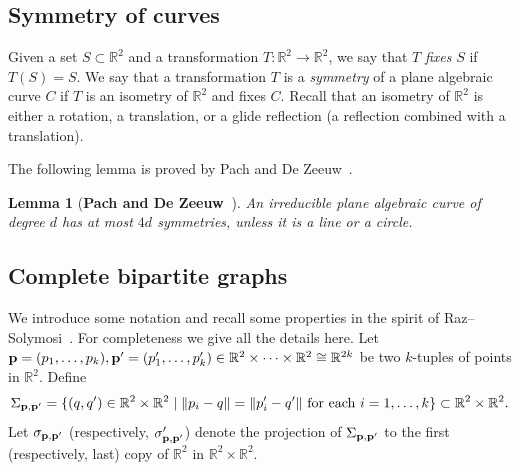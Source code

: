 \documentclass[letterpaper, reqno,11pt]{article}
\newcommand{\RR}{\mathbb{R}}
\newcommand{\p}{{\bf p}}
\newtheorem{lem}[thm]{Lemma}
\theoremstyle{definition}
\theoremstyle{remark}
\begin{document}
\subsection{Symmetry of curves}
Given a set $S\subset \RR^2$ and a transformation $T:\RR^2\to\RR^2$, we say that $T$ {\it fixes} $S$ if $T(S) = S$. 
We say that a transformation $T$ is a {\it symmetry} of a plane algebraic curve $C$ if $T$ is an isometry of $\RR^2$ and fixes $C$. Recall that an isometry of $\RR^2$ is either a rotation, a translation, or a glide reflection (a reflection combined with a translation).

The following lemma is proved by Pach and De Zeeuw~\cite[Lemma 2.5]{PachDeZeeuw}.
\begin{lem}[{\bf Pach and De Zeeuw~\cite[Lemma 2.5]{PachDeZeeuw}}]\label{lem:symmetries}
An irreducible plane algebraic curve of degree $d$ has at most $4d$ symmetries, unless it is a line or a circle.
\end{lem}

\subsection{Complete bipartite graphs}\label{subsec:bipartite}
We introduce some notation and recall some properties in the spirit of Raz--Solymosi~\cite[Section 3]{RazSol}. 
For completeness we give all the details here. 
Let $\p=(p_1,\ldots,p_k), \p'=(p_1',\ldots,p_k')\in \RR^2\times\cdots\times \RR^2\cong\RR^{2k} $ be two $k$-tuples of points in $\RR^2$. 
Define
$$
\Sigma_{\p,\p'}=\{(q,q')\in \RR^2\times \RR^2\mid \text{$\|p_i-q\|=\|p_i'-q'\|$ for each $i=1,\ldots,k$}\}\subset \RR^2\times \RR^2.
$$
Let $\sigma_{\p,\p'}$ (respectively, $\sigma'_{\p,\p'}$) denote the projection of $\Sigma_{\p,\p'}$ to the first (respectively, last) copy of $\RR^2$ in $\RR^2\times \RR^2$.
\end{document}
